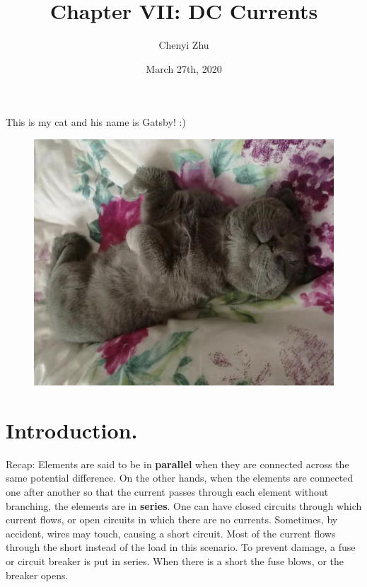 \documentclass[11pt, letterpaper]{article}
\title{Chapter VII: DC Currents}
\author{Chenyi Zhu}
\date{March 27th, 2020}
\begin{document}
\begin{titlingpage}
	\maketitle
	
	\begin{center}
		This is my cat and his name is Gatsby! :)
	\end{center}
	
	\begin{figure}[h!]
		\centering
		\includegraphics[scale=0.2]{gatsby}
		\label{fig:flux}
	\end{figure}
		
\end{titlingpage}

\section{Introduction.}
Recap: Elements are said to be in \textbf{parallel} when they are connected across the same potential difference. On the other hands, when the elements are connected one after another so that the current passes through each element without branching, the elements are in \textbf{series}. One can have closed circuits through which current flows, or open circuits in which there are no currents. Sometimes, by accident, wires may touch, causing a short circuit. Most of the current flows through the short instead of the load in this scenario. To prevent damage, a fuse or circuit breaker is put in series. When there is a short the fuse blows, or the breaker opens.
\end{document}
